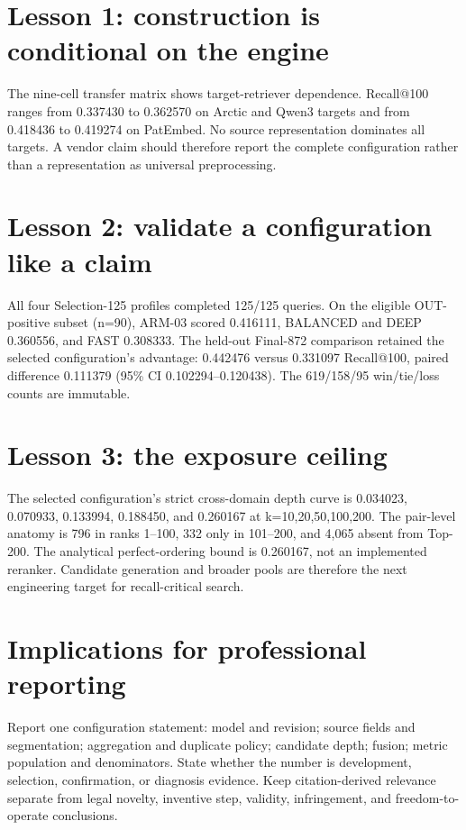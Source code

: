 \documentclass[preprint,12pt]{elsarticle}
\begin{document}
\section{Lesson 1: construction is conditional on the engine}
The nine-cell transfer matrix shows target-retriever dependence. Recall@100 ranges from 0.337430 to 0.362570 on Arctic and Qwen3 targets and from 0.418436 to 0.419274 on PatEmbed. No source representation dominates all targets. A vendor claim should therefore report the complete configuration rather than a representation as universal preprocessing.

\section{Lesson 2: validate a configuration like a claim}
All four Selection-125 profiles completed 125/125 queries. On the eligible OUT-positive subset (n=90), ARM-03 scored 0.416111, BALANCED and DEEP 0.360556, and FAST 0.308333. The held-out Final-872 comparison retained the selected configuration's advantage: 0.442476 versus 0.331097 Recall@100, paired difference 0.111379 (95\% CI 0.102294--0.120438). The 619/158/95 win/tie/loss counts are immutable.

\section{Lesson 3: the exposure ceiling}
The selected configuration's strict cross-domain depth curve is 0.034023, 0.070933, 0.133994, 0.188450, and 0.260167 at k=10,20,50,100,200. The pair-level anatomy is 796 in ranks 1--100, 332 only in 101--200, and 4,065 absent from Top-200. The analytical perfect-ordering bound is 0.260167, not an implemented reranker. Candidate generation and broader pools are therefore the next engineering target for recall-critical search.

\section{Implications for professional reporting}
Report one configuration statement: model and revision; source fields and segmentation; aggregation and duplicate policy; candidate depth; fusion; metric population and denominators. State whether the number is development, selection, confirmation, or diagnosis evidence. Keep citation-derived relevance separate from legal novelty, inventive step, validity, infringement, and freedom-to-operate conclusions.
\end{document}

